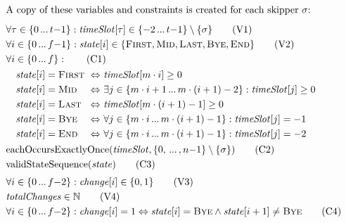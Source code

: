\documentclass{llncs}
\newcommand{\timeSlot}{\mathit{timeSlot}}
\newcommand{\state}{\mathit{state}}
\newcommand{\change}{\mathit{change}}
\newcommand{\totalChanges}{\mathit{totalChanges}}
\newcommand{\FIRST}{\textnormal{\textsc{First}}}
\newcommand{\MID}{\textnormal{\textsc{Mid}}}
\newcommand{\LAST}{\textnormal{\textsc{Last}}}
\newcommand{\END}{\textnormal{\textsc{End}}}
\newcommand{\BYE}{\textnormal{\textsc{Bye}}}
\newcommand{\eachOccursExactlyOnce}{\mathrm{eachOccursExactlyOnce}}
\newcommand{\validStateSequence}{\mathrm{validStateSequence}}
\newcommand\nldots{\,\hbox to 0.8em{.\hss.\hss.}\,}
\begin{document}
\begin{figure}[p]
\setlength{\mathindent}{1em}
\setlength{\abovedisplayskip}{0pt}
\setlength{\belowdisplayskip}{0pt}
\setlength{\abovecaptionskip}{0pt}
\begin{framed}
\begin{align}
    \intertext{A copy of these variables and constraints is created for each skipper $\sigma$:\smallskip}
    &\forall \tau \in \{0 \nldots t{-}1\}: \timeSlot[{\tau}] \in \{{-}2 \nldots t{-}1\} \setminus \{\sigma\} \label{var:timeSlot} \tag{V1} \\
    &\forall i \in \{0 \nldots f{-}1\}: \state[{i}] \in \{\FIRST,\MID,\LAST,\BYE,\END\} \label{var:state} \tag{V2} \\
    &\forall i \in \{0 \nldots f\}: \label{C1} \tag{C1} \\
    &\begin{alignedat}{3}
    &\hspace*{1em} \state[{i}] = \FIRST &\ &\Leftrightarrow&&\ \timeSlot[{m \cdot i}] \geq 0 \\
    &\hspace*{1em} \state[{i}] = \MID   &\ &\Leftrightarrow&&\ \exists j \in \{m \cdot i + 1 \nldots m \cdot (i + 1) - 2\} : \timeSlot[{j}] \geq 0 \\
    &\hspace*{1em} \state[{i}] = \LAST  &\ &\Leftrightarrow&&\ \timeSlot[m \cdot (i + 1) - 1] \geq 0 \\
    &\hspace*{1em} \state[{i}] = \BYE   &\ &\Leftrightarrow&&\ \forall j \in \{m \cdot i \nldots m \cdot (i + 1) - 1\} : \timeSlot[j] = -1 \\
    &\hspace*{1em} \state[{i}] = \END   &\ &\Leftrightarrow&&\ \forall j \in \{m \cdot i \nldots m \cdot (i + 1) - 1\} : \timeSlot[j] = -2
    \end{alignedat} \nonumber \\
    &\eachOccursExactlyOnce(\timeSlot, \{0, \nldots, n{-}1\} \setminus \{\sigma\}) \label{C2} \tag{C2} \\
    &\validStateSequence(\state) \label{C3} \tag{C3} \\[0.1cm]
    & \forall i \in \{0 \nldots f{-}2\}: \change[{i}] \in \{0,1\} \label{V3} \tag{V3} \\
    & \totalChanges \in \mathbb{N} \label{V4} \tag{V4} \\
    & \forall i \in \{0 \nldots f{-}2\}: \change[{i}] = 1 \Leftrightarrow \state[{i}] = \BYE \wedge \state[{i + 1}] \neq \BYE \label {C4} \tag{C4} \\

\end{align}
\end{framed}
\end{figure}
\end{document}
